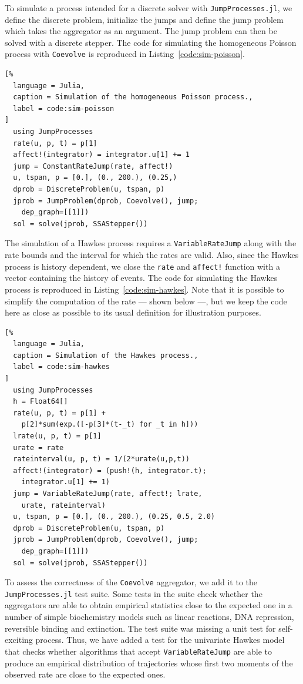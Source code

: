 \documentclass{juliacon}
\begin{document}
To simulate a process intended for a discrete solver with \texttt{JumpProcesses.jl}, we define the discrete problem, initialize the jumps and define the jump problem which takes the aggregator as an argument. The jump problem can then be solved with a discrete stepper. The code for simulating the homogeneous Poisson process with \texttt{Coevolve} is reproduced in Listing~\ref{code:sim-poisson}.

\begin{lstlisting}[%
  language = Julia,
  caption = Simulation of the homogeneous Poisson process.,
  label = code:sim-poisson
]
  using JumpProcesses
  rate(u, p, t) = p[1]
  affect!(integrator) = integrator.u[1] += 1
  jump = ConstantRateJump(rate, affect!)
  u, tspan, p = [0.], (0., 200.), (0.25,)
  dprob = DiscreteProblem(u, tspan, p)
  jprob = JumpProblem(dprob, Coevolve(), jump; 
    dep_graph=[[1]])
  sol = solve(jprob, SSAStepper())
\end{lstlisting}

The simulation of a Hawkes process requires a \texttt{VariableRateJump} along with the rate bounds and the interval for which the rates are valid. Also, since the Hawkes process is history dependent, we close the \texttt{rate} and \texttt{affect!} function with a vector containing the history of events. The code for simulating the Hawkes process is reproduced in Listing~\ref{code:sim-hawkes}. Note that it is possible to simplify the computation of the rate --- shown below ---, but we keep the code here as close as possible to its usual definition for illustration purposes.

\begin{lstlisting}[%
  language = Julia, 
  caption = Simulation of the Hawkes process.,
  label = code:sim-hawkes
]
  using JumpProcesses
  h = Float64[]
  rate(u, p, t) = p[1] + 
    p[2]*sum(exp.([-p[3]*(t-_t) for _t in h]))
  lrate(u, p, t) = p[1]
  urate = rate
  rateinterval(u, p, t) = 1/(2*urate(u,p,t))
  affect!(integrator) = (push!(h, integrator.t); 
    integrator.u[1] += 1)
  jump = VariableRateJump(rate, affect!; lrate, 
    urate, rateinterval)
  u, tspan, p = [0.], (0., 200.), (0.25, 0.5, 2.0)
  dprob = DiscreteProblem(u, tspan, p)
  jprob = JumpProblem(dprob, Coevolve(), jump; 
    dep_graph=[[1]])
  sol = solve(jprob, SSAStepper())
\end{lstlisting}

To assess the correctness of the \texttt{Coevolve} aggregator, we add it to the \texttt{JumpProcesses.jl} test suite. Some tests in the suite check whether the aggregators are able to obtain empirical statistics close to the expected one in a number of simple biochemistry models such as linear reactions, DNA repression, reversible binding and extinction. The test suite was missing a unit test for self-exciting process. Thus, we have added a test for the univariate Hawkes model that checks whether algorithms that accept \texttt{VariableRateJump} are able to produce an empirical distribution of trajectories whose first two moments of the observed rate are close to the expected ones.
\end{document}
